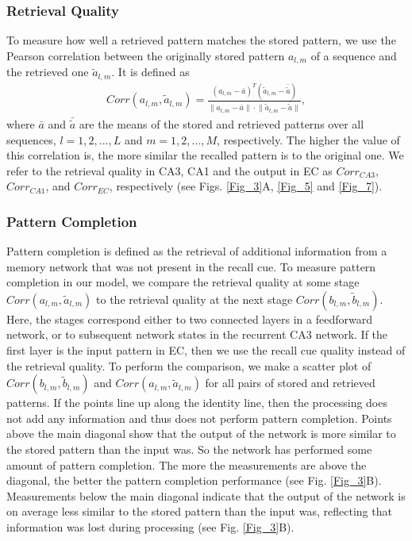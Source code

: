 \documentclass[utf8]{frontiersSCNS} %
\begin{document}
\subsubsection{Retrieval Quality}
To measure how well a retrieved pattern matches the stored pattern, we use the Pearson correlation between the originally stored pattern $a_{l, m}$ of a sequence  and the retrieved one $\tilde{a}_{l, m}$. It is defined as
\begin{align*}
	Corr(a_{l, m},\tilde{a}_{l, m})  = \frac{(a_{l, m} -\bar{a})^T(\tilde{a}_{l, m} -\bar{\tilde{a}})}
{\lVert{a_{l, m} -\bar{a}} \rVert \cdot \lVert{\tilde{a}_{l, m} -\bar{\tilde{a}}}\rVert },
\end{align*}     
where $\bar{a}$ and $\bar{\tilde{a}}$ are the means of the stored and retrieved patterns over all sequences, $l = 1,2, ..., L$ and $m = 1,2, ..., M$, respectively. The higher the value of this correlation is, the more similar the recalled pattern is to the original one. We refer to the retrieval quality in CA3, CA1 and the output in EC as $Corr_{CA3}$, $Corr_{CA1}$, and $Corr_{EC}$, respectively (see Figs. \ref{Fig_3}A, \ref{Fig_5} and \ref{Fig_7}).

\subsubsection{Pattern Completion}
Pattern completion is defined as the retrieval of additional information from a memory network that was not present in the recall cue. To measure pattern completion in our model, we compare the retrieval quality at some stage $Corr(a_{l, m},\tilde{a}_{l, m})$ to the retrieval quality at the next stage $Corr(b_{l, m},\tilde{b}_{l, m})$. Here, the stages correspond either to two connected layers in a feedforward network, or to subsequent network states in the recurrent CA3 network. If the first layer is the input pattern in EC, then we use the recall cue quality instead of the retrieval quality.
%
To perform the comparison, we make a scatter plot of
$Corr(b_{l, m},\tilde{b}_{l, m})$ and
$Corr(a_{l, m},\tilde{a}_{l, m})$ 
for all pairs of stored and retrieved patterns.
If the points line up along the identity line, then the processing does not add any information and thus does not perform pattern completion. Points above the main diagonal show that the output of the network is more similar to the stored pattern than the input was. So the network has performed some amount of pattern completion. The more the measurements are above the diagonal, the better the pattern completion performance (see Fig. \ref{Fig_3}B). Measurements below the main diagonal indicate that the output of the network is on average less similar to the stored pattern than the input was, reflecting that information was lost during processing (see Fig. \ref{Fig_3}B).
\end{document}
